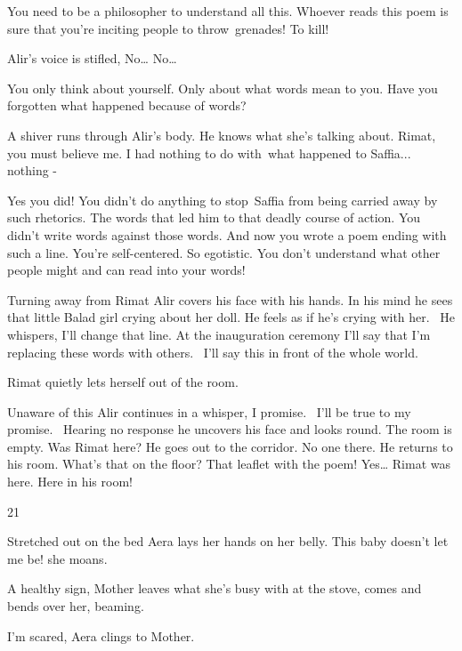 \documentclass[letterpaper]{article}
\begin{document}
{\textquotedbl}You need to be a philosopher to understand all this. Whoever reads this poem is sure that you're inciting
people to throw~grenades! To kill!{\textquotedbl} 

Alir's voice is stifled, {\textquotedbl}No{\dots} No{\dots}{\textquotedbl} 

{\textquotedbl}You only think about yourself. Only about what words mean to you. Have you forgotten what happened
because of words?{\textquotedbl}

A shiver runs through Alir's body. He knows what she's talking about. {\textquotedbl}Rimat, you must believe me. I had
nothing to do with~what happened to Saffia... nothing - {\textquotedbl} 

{\textquotedbl}Yes you did! You didn't do anything to stop~Saffia from being carried away by such rhetorics. The words
that led him to that deadly course of action. You didn't write words against those words. And now you wrote a poem
ending with such a line. You're self-centered. So egotistic.\textcolor[rgb]{0.8901961,0.42352942,0.039215688}{ }You
don't understand what other people might and can read into your words!{\textquotedbl} 

Turning away from Rimat Alir covers his face with his hands. In his mind he sees that little Balad girl crying about her
doll. He feels as if he's crying with her. ~He whispers, {\textquotedbl}I'll change that line. At the inauguration
ceremony I'll say that I'm replacing these words with others.~ I'll say this in front of the whole
world.{\textquotedbl} 

Rimat quietly lets herself out of the room.

Unaware of this Alir continues in a whisper, {\textquotedbl}I promise. \ I'll be true to my promise.{\textquotedbl}~
Hearing no response he uncovers his face and looks round. The room is empty. Was Rimat here? He goes out to the
corridor. No one there. He returns to his room. What's that on the floor? That leaflet with the poem! Yes{\dots} Rimat
was here. Here in his room!


\bigskip

21 

Stretched out on the bed Aera lays her hands on her belly. {\textquotedbl}This baby doesn't let me be!{\textquotedbl}
she moans.

{\textquotedbl}A healthy sign,{\textquotedbl} Mother leaves what she's busy with at the stove, comes and bends over her,
beaming. 

{\textquotedbl}I'm scared,{\textquotedbl} Aera clings to Mother{.}
\end{document}
